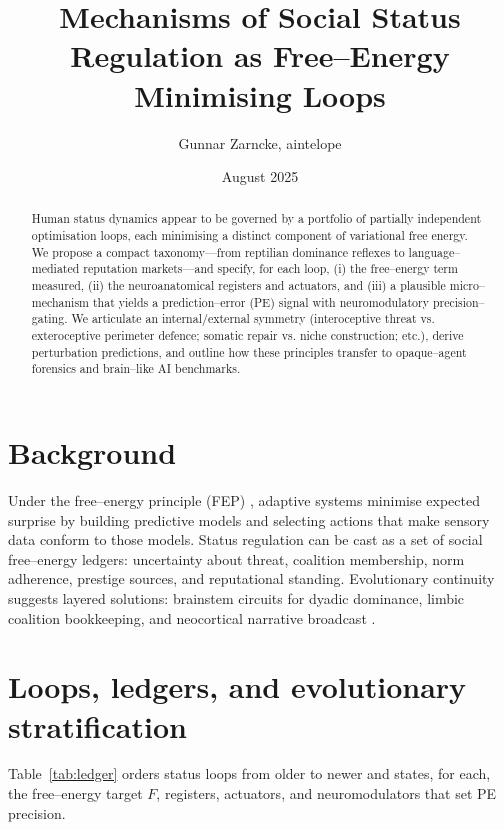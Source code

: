 \documentclass[11pt]{article}
\title{Mechanisms of Social Status Regulation as Free--Energy Minimising Loops}
\author{Gunnar Zarncke, aintelope}
\date{August 2025}
\begin{document}
\maketitle

\begin{abstract}
Human status dynamics appear to be governed by a portfolio of partially independent optimisation loops, each minimising a distinct component of variational free energy. We propose a compact taxonomy---from reptilian dominance reflexes to language--mediated reputation markets---and specify, for each loop, (i) the free--energy term measured, (ii) the neuroanatomical registers and actuators, and (iii) a plausible micro--mechanism that yields a prediction--error (PE) signal with neuromodulatory precision--gating. We articulate an internal/external symmetry (interoceptive threat vs. exteroceptive perimeter defence; somatic repair vs. niche construction; etc.), derive perturbation predictions, and outline how these principles transfer to opaque--agent forensics and brain--like AI benchmarks.
\end{abstract}

\section{Background}
Under the free--energy principle (FEP) \cite{Friston2010}, adaptive systems minimise expected surprise by building predictive models and selecting actions that make sensory data conform to those models. Status regulation can be cast as a set of social free--energy ledgers: uncertainty about threat, coalition membership, norm adherence, prestige sources, and reputational standing. Evolutionary continuity suggests layered solutions: brainstem circuits for dyadic dominance, limbic coalition bookkeeping, and neocortical narrative broadcast \cite{Sapolsky2004,HenrichGilWhite2001,Zink2008}.

\section{Loops, ledgers, and evolutionary stratification}
Table~\ref{tab:ledger} orders status loops from older to newer and states, for each, the free--energy target $F$, registers, actuators, and neuromodulators that set PE precision.
\end{document}
